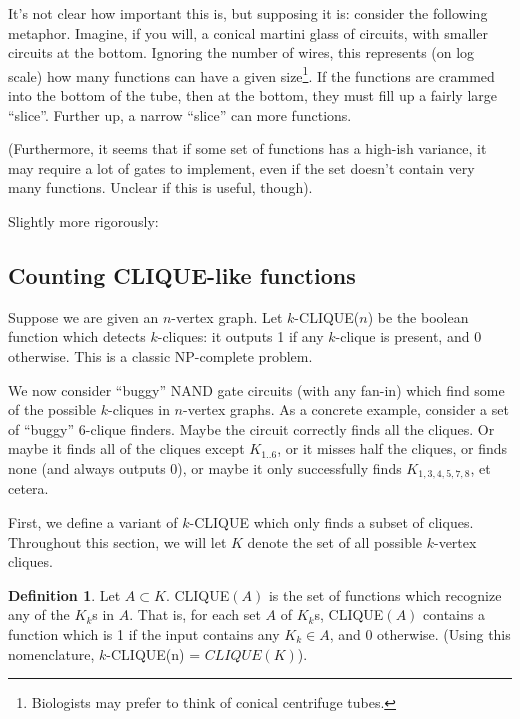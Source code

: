 \documentclass[12pt]{article}
\theoremstyle{definition}
\newtheorem{defn}{Definition}[section]
\begin{document}
It's not clear how important this is, but supposing it is: consider
the following metaphor. Imagine, if you will, a conical martini
glass of circuits, with smaller circuits at the bottom. Ignoring
the number of wires, this represents (on log scale) how many
functions can have a given size\footnote{Biologists may
prefer to think of conical centrifuge tubes.}.
If the functions are crammed into the bottom of the tube, then
at the bottom, they must fill up a fairly large ``slice''.
Further up,
a narrow ``slice'' can more functions. 

(Furthermore, it seems that if some set of functions has a
high-ish variance, it may require a lot of gates to implement,
even if the set doesn't contain very many functions.
Unclear if this is useful, though).

Slightly more rigorously:








\subsection{Counting CLIQUE-like functions}

Suppose we are given an $n$-vertex graph.
Let $k$-CLIQUE($n$) be the boolean function which
detects $k$-cliques: it outputs 1 if any $k$-clique
is present, and 0 otherwise. This is a classic
NP-complete problem.

We now consider ``buggy'' NAND gate circuits (with any fan-in) which find some of the possible $k$-cliques in $n$-vertex
graphs.
As a concrete example,
consider a set of ``buggy'' 6-clique finders. 
Maybe the circuit correctly
finds all the cliques. Or maybe it finds all of the cliques except $K_{1..6}$,
or it misses half the cliques, or finds none (and always outputs 0), or maybe
it only successfully finds $K_{1,3,4,5,7,8}$, et cetera.

First, we define a variant of $k$-CLIQUE which only
finds a subset of cliques. Throughout this section,
we will let $K$ denote the set of all possible
$k$-vertex cliques.

\begin{defn}
\label{CLIQUE}
Let $A \subset K$.
CLIQUE$(A)$ is the set of functions which recognize any of the $K_k$s in $A$. That is, for each set $A$ of $K_k$s, CLIQUE$(A)$
contains a function which is 1 if the input contains any $K_k \in A$,
and 0 otherwise. (Using this nomenclature,
$k$-CLIQUE(n) = $CLIQUE(K)$).
\end{defn}
\end{document}
